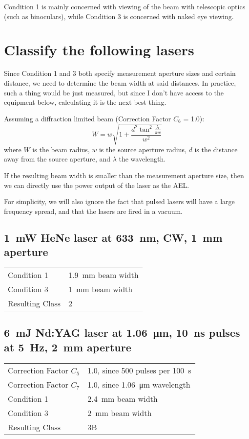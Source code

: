 \documentclass[a4paper]{scrartcl}
\begin{document}
Condition 1 is mainly concerned with viewing of the beam with telescopic optics (such as binoculars), while Condition 3 is concerned with naked eye viewing.

\section{Classify the following lasers}
Since Condition 1 and 3 both specify measurement aperture sizes and certain distance, we need to determine the beam width at said distances. In practice, such a thing would be just measured, but since I don't have access to the equipment below, calculating it is the next best thing.

Assuming a diffraction limited beam (Correction Factor \(C_6\) = 1.0):
\[W = w \sqrt{1 + \frac{d^2 \tan^2 \frac{\lambda}{\pi w}}{w^2}}\]
where \(W\) is the beam radius, \(w\) is the source aperture radius, \(d\) is the distance away from the source aperture, and \(\lambda\) the wavelength.

If the resulting beam width is smaller than the measurement aperture size, then we can directly use the power output of the laser as the AEL.

For simplicity, we will also ignore the fact that pulsed lasers will have a large frequency spread, and that the lasers are fired in a vacuum.

\subsection{\SI{1}{\milli\watt} HeNe laser at \SI{633}{\nano\metre}, CW, \SI{1}{\milli\metre} aperture}
\begin{tabular}{l | l}
    Condition 1 & \SI{1.9}{\milli\metre} beam width \\
    Condition 3 & \SI{1}{\milli\metre} beam width \\
    Resulting Class & 2
\end{tabular}

\subsection{\SI{6}{\milli\joule} Nd:YAG laser at \SI{1.06}{\micro\metre}, \SI{10}{\nano\second} pulses at \SI{5}{\hertz}, \SI{2}{\milli\metre} aperture}
\begin{tabular}{l | l}
    Correction Factor \(C_5\) & 1.0, since 500 pulses per \SI{100}{\second} \\
    Correction Factor \(C_7\) & 1.0, since \SI{1.06}{\micro\metre} wavelength \\
    Condition 1 & \SI{2.4}{\milli\metre} beam width \\
    Condition 3 & \SI{2}{\milli\metre} beam width \\
    Resulting Class & 3B
\end{tabular}
\end{document}
